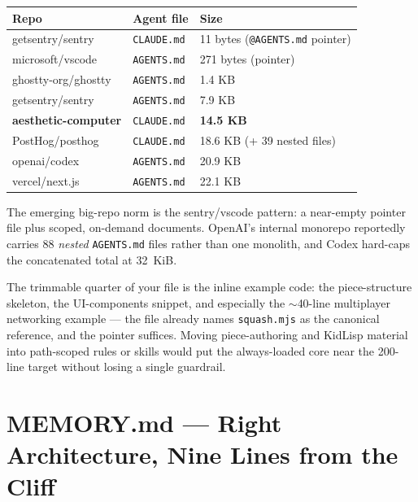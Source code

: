 \documentclass[11pt,letterpaper]{article}
\begin{document}
\begin{center}
\small
\begin{tabular}{lll}
\toprule
\textbf{Repo} & \textbf{Agent file} & \textbf{Size} \\
\midrule
getsentry/sentry & \texttt{CLAUDE.md} & 11 bytes (\texttt{@AGENTS.md} pointer) \\
microsoft/vscode & \texttt{AGENTS.md} & 271 bytes (pointer) \\
ghostty-org/ghostty & \texttt{AGENTS.md} & 1.4 KB \\
getsentry/sentry & \texttt{AGENTS.md} & 7.9 KB \\
\textbf{aesthetic-computer} & \texttt{CLAUDE.md} & \textbf{14.5 KB} \\
PostHog/posthog & \texttt{CLAUDE.md} & 18.6 KB (+ 39 nested files) \\
openai/codex & \texttt{AGENTS.md} & 20.9 KB \\
vercel/next.js & \texttt{AGENTS.md} & 22.1 KB \\
\bottomrule
\end{tabular}
\end{center}

The emerging big-repo norm is the sentry/vscode pattern: a near-empty pointer file plus scoped, on-demand documents. OpenAI's internal monorepo reportedly carries 88 \textit{nested} \texttt{AGENTS.md} files rather than one monolith, and Codex hard-caps the concatenated total at 32~KiB.

The trimmable quarter of your file is the inline example code: the piece-structure skeleton, the UI-components snippet, and especially the $\sim$40-line multiplayer networking example --- the file already names \texttt{squash.mjs} as the canonical reference, and the pointer suffices. Moving piece-authoring and KidLisp material into path-scoped rules or skills would put the always-loaded core near the 200-line target without losing a single guardrail.

\section{MEMORY.md --- Right Architecture, Nine Lines from the Cliff}
\end{document}
